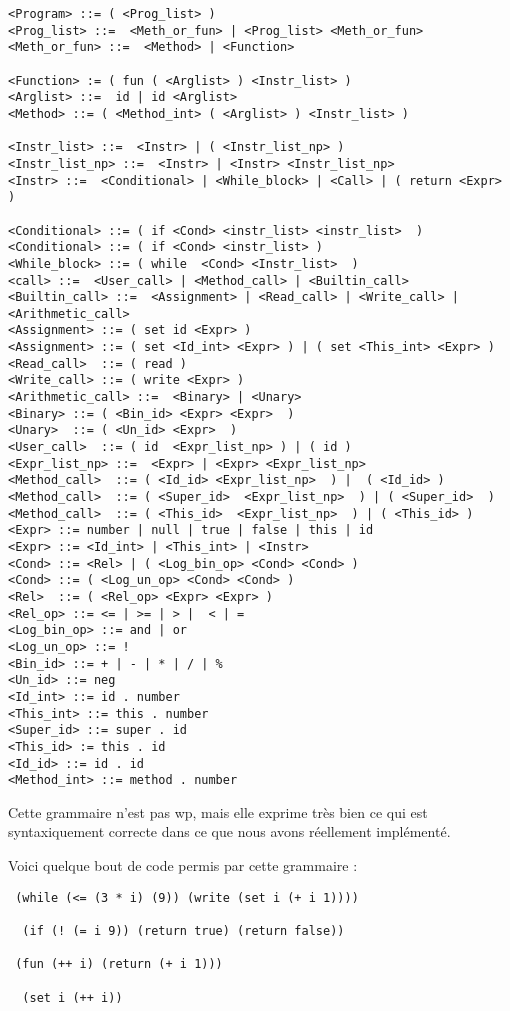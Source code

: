 \begin{verbatim}
<Program> ::= ( <Prog_list> )
<Prog_list> ::=  <Meth_or_fun> | <Prog_list> <Meth_or_fun>	
<Meth_or_fun> ::=  <Method> | <Function>

<Function> := ( fun ( <Arglist> ) <Instr_list> ) 
<Arglist> ::=  id | id <Arglist>
<Method> ::= ( <Method_int> ( <Arglist> ) <Instr_list> )
 
<Instr_list> ::=  <Instr> | ( <Instr_list_np> ) 
<Instr_list_np> ::=  <Instr> | <Instr> <Instr_list_np>
<Instr> ::=  <Conditional> | <While_block> | <Call> | ( return <Expr> ) 

<Conditional> ::= ( if <Cond> <instr_list> <instr_list>  )  
<Conditional> ::= ( if <Cond> <instr_list> )
<While_block> ::= ( while  <Cond> <Instr_list>  ) 
<call> ::=  <User_call> | <Method_call> | <Builtin_call> 
<Builtin_call> ::=  <Assignment> | <Read_call> | <Write_call> | <Arithmetic_call>
<Assignment> ::= ( set id <Expr> ) 
<Assignment> ::= ( set <Id_int> <Expr> ) | ( set <This_int> <Expr> )
<Read_call>  ::= ( read )
<Write_call> ::= ( write <Expr> )
<Arithmetic_call> ::=  <Binary> | <Unary>
<Binary> ::= ( <Bin_id> <Expr> <Expr>  )
<Unary>  ::= ( <Un_id> <Expr>  )
<User_call>  ::= ( id  <Expr_list_np> ) | ( id ) 
<Expr_list_np> ::=  <Expr> | <Expr> <Expr_list_np>
<Method_call>  ::= ( <Id_id> <Expr_list_np>  ) |  ( <Id_id> )   
<Method_call>  ::= ( <Super_id>  <Expr_list_np>  ) | ( <Super_id>  )
<Method_call>  ::= ( <This_id>  <Expr_list_np>  ) | ( <This_id> )
<Expr> ::= number | null | true | false | this | id 
<Expr> ::= <Id_int> | <This_int> | <Instr>
<Cond> ::= <Rel> | ( <Log_bin_op> <Cond> <Cond> )
<Cond> ::= ( <Log_un_op> <Cond> <Cond> )
<Rel>  ::= ( <Rel_op> <Expr> <Expr> ) 
<Rel_op> ::= <= | >= | > |  < | =
<Log_bin_op> ::= and | or
<Log_un_op> ::= !
<Bin_id> ::= + | - | * | / | %
<Un_id> ::= neg
<Id_int> ::= id . number
<This_int> ::= this . number
<Super_id> ::= super . id
<This_id> := this . id 
<Id_id> ::= id . id
<Method_int> ::= method . number
\end{verbatim}
Cette grammaire n'est pas wp, mais elle exprime très bien ce qui est syntaxiquement correcte dans ce que nous avons réellement implémenté. 

Voici quelque bout de code permis par cette grammaire :

\begin{verbatim}
 (while (<= (3 * i) (9)) (write (set i (+ i 1))))
  
  (if (! (= i 9)) (return true) (return false))

 (fun (++ i) (return (+ i 1)))

  (set i (++ i))
\end{verbatim}





 